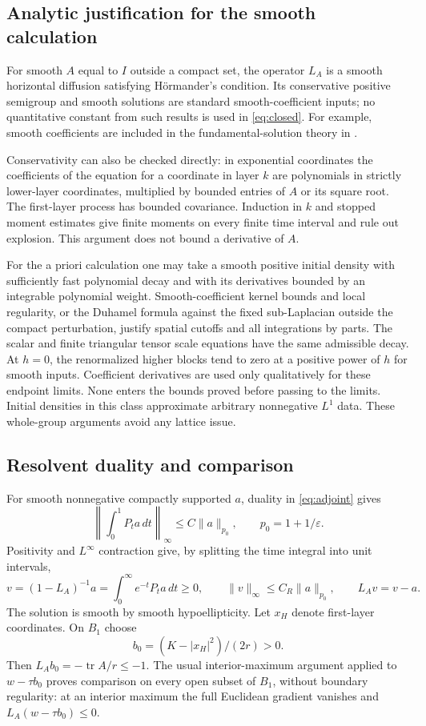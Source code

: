 \documentclass[11pt,a4paper]{amsart}
\numberwithin{equation}{section}
\theoremstyle{remark}\newtheorem{remark}[theorem]{Remark}
\newcommand{\eps}{\varepsilon}
\newcommand{\tr}{\operatorname{tr}}
\newcommand{\norm}[1]{\lVert #1\rVert}
\newcommand{\dd}{\,d}
\begin{document}
\subsection{Analytic justification for the smooth calculation}
For smooth $A$ equal to $I$ outside a compact set, the operator $L_A$ is a
smooth horizontal diffusion satisfying H\"ormander's condition. Its conservative
positive semigroup and smooth solutions are standard smooth-coefficient
inputs; no quantitative constant from such results is used in
\eqref{eq:closed}. For example, smooth coefficients are included in the
fundamental-solution theory in \cite{BLU,Faini}.

Conservativity can also be checked directly: in exponential coordinates the
coefficients of the equation for a coordinate in layer $k$ are polynomials in
strictly lower-layer coordinates, multiplied by bounded entries of $A$ or its
square root. The first-layer process has bounded covariance. Induction in $k$
and stopped moment estimates give finite moments on every finite time interval
and rule out explosion. This argument does not bound a derivative of $A$.

For the a priori calculation one may take a smooth positive initial density
with sufficiently fast polynomial decay and with its derivatives bounded by
an integrable polynomial weight. Smooth-coefficient kernel bounds and local
regularity, or the Duhamel formula against the fixed sub-Laplacian outside the
compact perturbation, justify spatial cutoffs and all integrations by parts.
The scalar and finite triangular tensor scale equations have the same
admissible decay. At $h=0$, the renormalized higher blocks tend to zero at a
positive power of $h$ for smooth inputs. Coefficient derivatives are used only
qualitatively for these endpoint limits. None enters the bounds proved before
passing to the limits. Initial densities in this class approximate arbitrary
nonnegative $L^1$ data. These whole-group arguments avoid any lattice issue.

\subsection{Resolvent duality and comparison}
For smooth nonnegative compactly supported $a$, duality in \eqref{eq:adjoint}
gives
\[
 \left\|\int_0^1P_ta\dd t\right\|_\infty\le C\norm a_{p_0},
 \qquad p_0=1+1/\eps.
\]
Positivity and $L^\infty$ contraction give, by splitting the time integral into
unit intervals,
\begin{equation}\label{eq:resolvent}
 v=(1-L_A)^{-1}a=\int_0^\infty e^{-t}P_ta\dd t\ge0,
 \qquad\norm v_\infty\le C_R\norm a_{p_0},\qquad L_Av=v-a.
\end{equation}
The solution is smooth by smooth hypoellipticity. Let $x_H$ denote first-layer
coordinates. On $B_1$ choose
\[
 b_0=(K-|x_H|^2)/(2r)>0.
\]
Then $L_Ab_0=-\tr A/r\le-1$. The usual interior-maximum argument applied to
$w-\tau b_0$ proves comparison on every open subset of $B_1$, without boundary
regularity: at an interior maximum the full Euclidean gradient vanishes and
$L_A(w-\tau b_0)\le0$.
\end{document}
